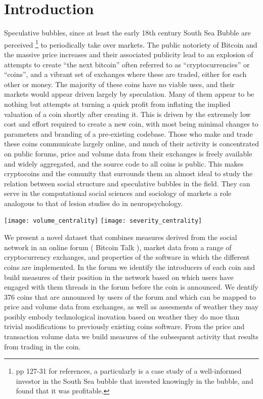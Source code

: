 \section{Introduction}

Speculative bubbles, since at least the early 18th century South Sea Bubble are perceived \footnote{\cite{garber2001famous} pp 127-31 for references, a particularly is \cite{temin2004riding} a case study of a well-informed investor in the South Sea bubble that invested knowingly in the bubble, and found that it was profitable. } to periodically take over markets. %
The public notoriety of Bitcoin and the massive price increases and their associated publicity  lead to an explosion of attempts to create ``the next bitcoin'' often referred to as ``cryptocurrencies'' or ``coins'', and a vibrant set of exchanges where these are traded, either for each other or money.
The majority of these coins have no viable uses, and their markets would appear driven largely by speculation.
Many of them appear to be nothing but attempts at turning a quick profit from inflating the implied valuation of a coin shortly after creating it.
This is driven by the extremely low cost and effort required to create a new coin, with most being minimal changes to parameters and branding of a pre-existing codebase.
Those who make and trade these coins communicate largely online, and much of their activity is concentrated on public forums, price and volume data from their exchanges is freely available and widely aggregated, and the source code to all coins is public.
This makes cryptocoins and the comunity that surrounds them an almost ideal to study the relation between social structure and speculative bubbles in the field.
They can serve in the computational social sciences and sociology of markets a role analogous to that of lesion studies do in neuropsychology.

\begin{figure*}
\texttt{[image: volume\_centrality]}
\texttt{[image: severity\_centrality]}
\end{figure*}


We present a novel dataset that combines measures derived from the social network in an online forum ( Bitcoin Talk ), market data from a range of cryptocurrency exchanges, and properties of the software in which the different coins are implemented.
In the forum we identify the introducers of each coin and build measures of their position in the network based on which users have engaged with them threads in the forum before the coin is announced.
We dentify 376 coins that are announced by users of the forum and which can be mapped to price and volume data from exchanges, as well as assesments of weather they may posibly embody technological inovation based on weather they do moe than trivial modifications to previously existing coins software.
From the price and transaction volume data we build measures of the subsequent activity that results from trading in the coin. 


